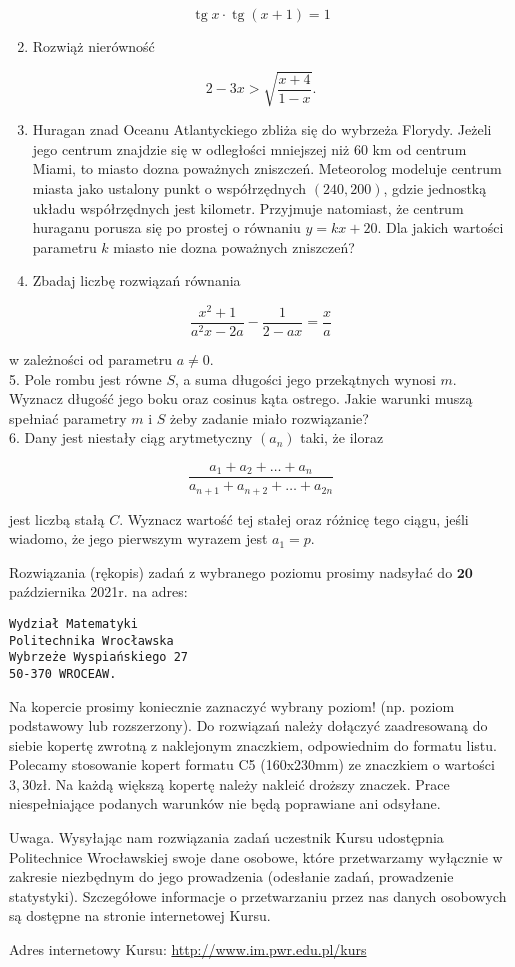 \documentclass[10pt]{article}
\begin{document}
$$
\operatorname{tg} x \cdot \operatorname{tg}(x+1)=1
$$

\begin{enumerate}
  \setcounter{enumi}{1}
  \item Rozwiąż nierówność
\end{enumerate}

$$
2-3 x>\sqrt{\frac{x+4}{1-x}} .
$$

\begin{enumerate}
  \setcounter{enumi}{2}
  \item Huragan znad Oceanu Atlantyckiego zbliża się do wybrzeża Florydy. Jeżeli jego centrum znajdzie się w odległości mniejszej niż 60 km od centrum Miami, to miasto dozna poważnych zniszczeń. Meteorolog modeluje centrum miasta jako ustalony punkt o współrzędnych $(240,200)$, gdzie jednostką układu współrzędnych jest kilometr. Przyjmuje natomiast, że centrum huraganu porusza się po prostej o równaniu $y=k x+20$. Dla jakich wartości parametru $k$ miasto nie dozna poważnych zniszczeń?
  \item Zbadaj liczbę rozwiązań równania
\end{enumerate}

$$
\frac{x^{2}+1}{a^{2} x-2 a}-\frac{1}{2-a x}=\frac{x}{a}
$$

w zależności od parametru $a \neq 0$.\\
5. Pole rombu jest równe $S$, a suma długości jego przekątnych wynosi $m$. Wyznacz długość jego boku oraz cosinus kąta ostrego. Jakie warunki muszą spełniać parametry $m$ i $S$ żeby zadanie miało rozwiązanie?\\
6. Dany jest niestały ciąg arytmetyczny $\left(a_{n}\right)$ taki, że iloraz

$$
\frac{a_{1}+a_{2}+\ldots+a_{n}}{a_{n+1}+a_{n+2}+\ldots+a_{2 n}}
$$

jest liczbą stałą $C$. Wyznacz wartość tej stałej oraz różnicę tego ciągu, jeśli wiadomo, że jego pierwszym wyrazem jest $a_{1}=p$.

Rozwiązania (rękopis) zadań z wybranego poziomu prosimy nadsyłać do $\mathbf{2 0}$ października 2021r. na adres:

\begin{verbatim}
Wydział Matematyki
Politechnika Wrocławska
Wybrzeże Wyspiańskiego 27
50-370 WROCEAW.
\end{verbatim}

Na kopercie prosimy koniecznie zaznaczyć wybrany poziom! (np. poziom podstawowy lub rozszerzony). Do rozwiązań należy dołączyć zaadresowaną do siebie kopertę zwrotną z naklejonym znaczkiem, odpowiednim do formatu listu. Polecamy stosowanie kopert formatu C5 (160x230mm) ze znaczkiem o wartości $3,30 \mathrm{zł}$. Na każdą większą kopertę należy nakleić droższy znaczek. Prace niespełniające podanych warunków nie będą poprawiane ani odsyłane.

Uwaga. Wysyłając nam rozwiązania zadań uczestnik Kursu udostępnia Politechnice Wrocławskiej swoje dane osobowe, które przetwarzamy wyłącznie w zakresie niezbędnym do jego prowadzenia (odesłanie zadań, prowadzenie statystyki). Szczegółowe informacje o przetwarzaniu przez nas danych osobowych są dostępne na stronie internetowej Kursu.

Adres internetowy Kursu: \href{http://www.im.pwr.edu.pl/kurs}{http://www.im.pwr.edu.pl/kurs}
\end{document}
